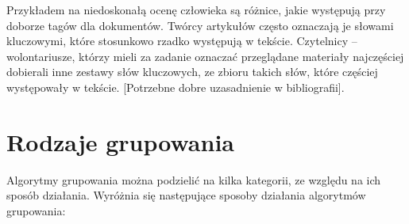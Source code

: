 \documentclass{article}
\begin{document}
Przykładem na niedoskonałą ocenę człowieka są różnice, jakie występują przy doborze tagów dla dokumentów. Twórcy artykułów często oznaczają je słowami kluczowymi, które stosunkowo rzadko występują w tekście. Czytelnicy – wolontariusze, którzy mieli za zadanie oznaczać przeglądane materiały najczęściej dobierali inne zestawy słów kluczowych, ze zbioru takich słów, które częściej występowały w tekście. [Potrzebne dobre uzasadnienie w bibliografii].

\newpage
\section{Rodzaje grupowania}

Algorytmy grupowania można podzielić na kilka kategorii, ze względu na ich sposób działania. Wyróżnia się następujące sposoby działania algorytmów grupowania:
\end{document}
